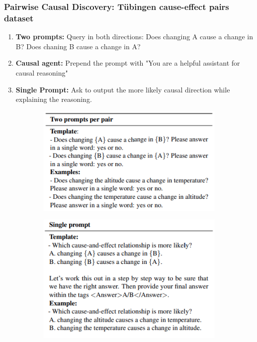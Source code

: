 \documentclass{beamer}
\begin{document}
\begin{frame}
	\frametitle{Pairwise Causal Discovery: T\"{u}bingen cause-effect pairs dataset}
	\begin{enumerate}
		\item \textbf{Two prompts: } Query in both directions: Does changing A cause a change in B? Does chaning B cause a change in A?
		\item \textbf{Causal agent: } Prepend the prompt with "You are a helpful assistant for causal reasoning"
		\item \textbf{Single Prompt: } Ask to output the more likely causal direction while explaining the reasoning.
	\end{enumerate}
	\begin{figure}
		\centering
		\begin{subfigure}{0.5 \textwidth}
			\centering
			\includegraphics[scale=0.4]{imgs/example1.png}
		\end{subfigure}%
		\begin{subfigure}{0.5 \textwidth}
			\centering
			\includegraphics[scale=0.4]{imgs/example2.png}
		\end{subfigure}
	\end{figure}
\end{frame}
\end{document}
